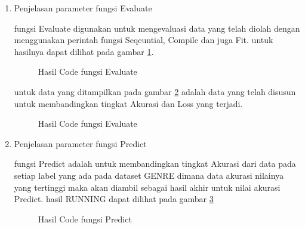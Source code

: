 \begin{enumerate}
\item Penjelasan parameter fungsi Evaluate



\subitem fungsi Evaluate digunakan untuk mengevaluasi data yang telah diolah dengan menggunakan perintah fungsi Seqeuntial, Compile dan juga Fit. untuk hasilnya dapat dilihat pada gambar \ref{f19}.

\begin{figure}[!htbp]
      \caption{Hasil Code fungsi Evaluate}
      \label{f19}
\end{figure}




\subitem untuk data yang ditampilkan pada gambar \ref{f20} adalah data yang telah disusun untuk membandingkan tingkat Akurasi dan Loss yang terjadi.

\begin{figure}[!htbp]
      \caption{Hasil Code fungsi Evaluate}
      \label{f20}
\end{figure}

\item Penjelasan parameter fungsi Predict



\subitem fungsi Predict adalah untuk membandingkan tingkat Akurasi dari data pada setiap label yang ada pada dataset GENRE dimana data akurasi nilainya yang tertinggi maka akan diambil sebagai hasil akhir untuk nilai akurasi Predict. hasil RUNNING dapat dilihat pada gambar \ref{f21}

\begin{figure}[!htbp]
      \caption{Hasil Code fungsi Predict}
      \label{f21}
\end{figure}
\end{enumerate}